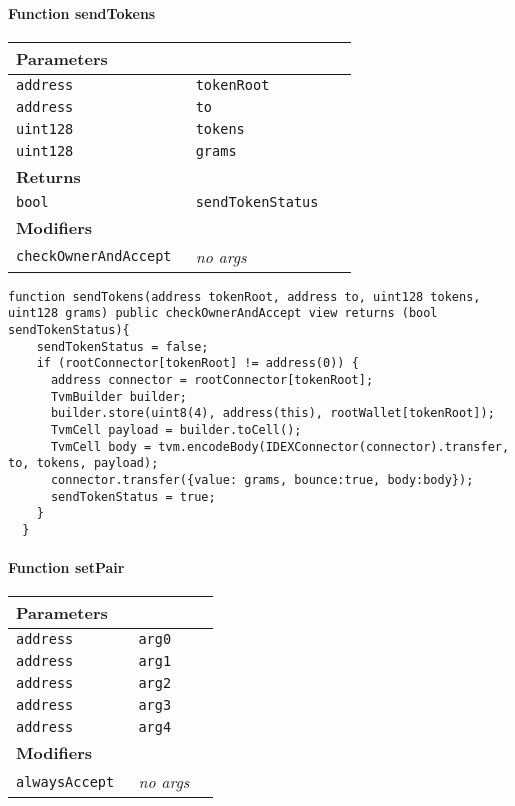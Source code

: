 \paragraph{Function sendTokens}


\ifsoltables
\noindent\begin{tabular}{|l|l|p{5cm}|}\hline
\multicolumn{3}{|l|}{\bf Parameters}\\\hline
\tt address & \tt tokenRoot &\\\hline
\tt address & \tt to &\\\hline
\tt uint128 & \tt tokens &\\\hline
\tt uint128 & \tt grams &\\\hline
\multicolumn{3}{|l|}{\bf Returns}\\\hline
\tt bool & \tt sendTokenStatus &\\\hline
\multicolumn{3}{|l|}{\bf Modifiers}\\\hline
\tt checkOwnerAndAccept & {\em no args} &\\\hline
\end{tabular}
\fi

\vspace{2cm}

\begin{lstlisting}[firstnumber=399]
  function sendTokens(address tokenRoot, address to, uint128 tokens, uint128 grams) public checkOwnerAndAccept view returns (bool sendTokenStatus){
    sendTokenStatus = false;
    if (rootConnector[tokenRoot] != address(0)) {
      address connector = rootConnector[tokenRoot];
      TvmBuilder builder;
      builder.store(uint8(4), address(this), rootWallet[tokenRoot]);
      TvmCell payload = builder.toCell();
      TvmCell body = tvm.encodeBody(IDEXConnector(connector).transfer, to, tokens, payload);
      connector.transfer({value: grams, bounce:true, body:body});
      sendTokenStatus = true;
    }
  }
\end{lstlisting}

\paragraph{Function setPair}


\ifsoltables
\noindent\begin{tabular}{|l|l|p{5cm}|}\hline
\multicolumn{3}{|l|}{\bf Parameters}\\\hline
\tt address & \tt arg0 &\\\hline
\tt address & \tt arg1 &\\\hline
\tt address & \tt arg2 &\\\hline
\tt address & \tt arg3 &\\\hline
\tt address & \tt arg4 &\\\hline
\multicolumn{3}{|l|}{\bf Modifiers}\\\hline
\tt alwaysAccept & {\em no args} &\\\hline
\end{tabular}
\fi

